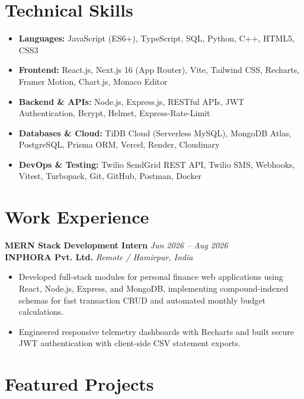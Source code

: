 \documentclass[a4paper,10pt]{article}
\begin{document}
\section*{Technical Skills}
\begin{itemize}[leftmargin=*]
    \item \textbf{Languages:} JavaScript (ES6+), TypeScript, SQL, Python, C++, HTML5, CSS3
    \item \textbf{Frontend:} React.js, Next.js 16 (App Router), Vite, Tailwind CSS, Recharts, Framer Motion, Chart.js, Monaco Editor
    \item \textbf{Backend \& APIs:} Node.js, Express.js, RESTful APIs, JWT Authentication, Bcrypt, Helmet, Express-Rate-Limit
    \item \textbf{Databases \& Cloud:} TiDB Cloud (Serverless MySQL), MongoDB Atlas, PostgreSQL, Prisma ORM, Vercel, Render, Cloudinary
    \item \textbf{DevOps \& Testing:} Twilio SendGrid REST API, Twilio SMS, Webhooks, Vitest, Turbopack, Git, GitHub, Postman, Docker
\end{itemize}

\section*{Work Experience}
\textbf{MERN Stack Development Intern} \hfill \textit{Jun 2026 -- Aug 2026}\\
\textbf{INPHORA Pvt. Ltd.} \hfill \textit{Remote / Hamirpur, India}
\begin{itemize}
    \item Developed full-stack modules for personal finance web applications using React, Node.js, Express, and MongoDB, implementing compound-indexed schemas for fast transaction CRUD and automated monthly budget calculations.
    \item Engineered responsive telemetry dashboards with Recharts and built secure JWT authentication with client-side CSV statement exports.
\end{itemize}

\section*{Featured Projects}
\end{document}
